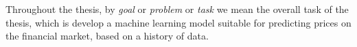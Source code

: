 
Throughout the thesis, by \emph{goal} or \emph{problem} or \emph{task} we mean the overall task of the thesis, which is develop a machine learning model suitable for predicting prices on the financial market, based on a history of data.

